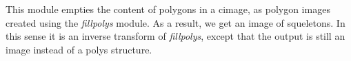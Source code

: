 This module empties the content of polygons in a cimage,
as polygon images created using the {\em fillpolys} module.
As a result, we get an image of squeletons.
In this sense it is an inverse transform of {\em fillpolys},
except that the output is still an image instead of a polys structure.

